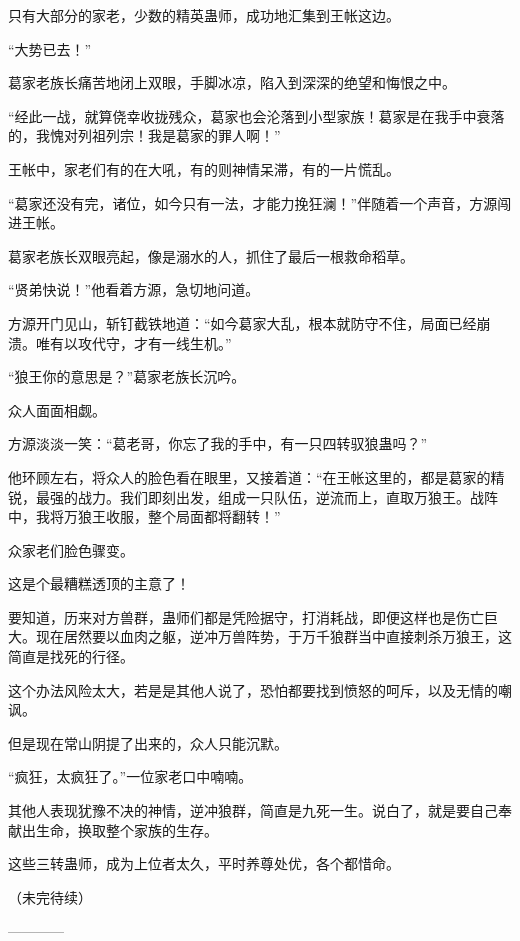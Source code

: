\begin{this_body}
只有大部分的家老，少数的精英蛊师，成功地汇集到王帐这边。

“大势已去！”

葛家老族长痛苦地闭上双眼，手脚冰凉，陷入到深深的绝望和悔恨之中。

“经此一战，就算侥幸收拢残众，葛家也会沦落到小型家族！葛家是在我手中衰落的，我愧对列祖列宗！我是葛家的罪人啊！”

王帐中，家老们有的在大吼，有的则神情呆滞，有的一片慌乱。

“葛家还没有完，诸位，如今只有一法，才能力挽狂澜！”伴随着一个声音，方源闯进王帐。

葛家老族长双眼亮起，像是溺水的人，抓住了最后一根救命稻草。

“贤弟快说！”他看着方源，急切地问道。

方源开门见山，斩钉截铁地道：“如今葛家大乱，根本就防守不住，局面已经崩溃。唯有以攻代守，才有一线生机。”

“狼王你的意思是？”葛家老族长沉吟。

众人面面相觑。

方源淡淡一笑：“葛老哥，你忘了我的手中，有一只四转驭狼蛊吗？”

他环顾左右，将众人的脸色看在眼里，又接着道：“在王帐这里的，都是葛家的精锐，最强的战力。我们即刻出发，组成一只队伍，逆流而上，直取万狼王。战阵中，我将万狼王收服，整个局面都将翻转！”

众家老们脸色骤变。

这是个最糟糕透顶的主意了！

要知道，历来对方兽群，蛊师们都是凭险据守，打消耗战，即便这样也是伤亡巨大。现在居然要以血肉之躯，逆冲万兽阵势，于万千狼群当中直接刺杀万狼王，这简直是找死的行径。

这个办法风险太大，若是是其他人说了，恐怕都要找到愤怒的呵斥，以及无情的嘲讽。

但是现在常山阴提了出来的，众人只能沉默。

“疯狂，太疯狂了。”一位家老口中喃喃。

其他人表现犹豫不决的神情，逆冲狼群，简直是九死一生。说白了，就是要自己奉献出生命，换取整个家族的生存。

这些三转蛊师，成为上位者太久，平时养尊处优，各个都惜命。

（未完待续）

------------

\end{this_body}

